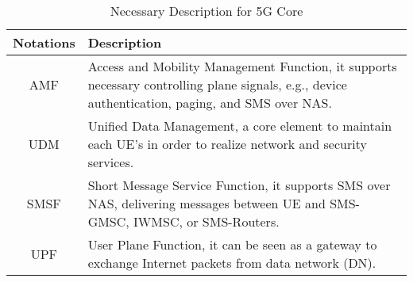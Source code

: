 \begin{table}[t]
	\caption{Necessary Description for 5G Core}\label{tab:5G}
	\centering
	\begin{tabular}{c|p{6cm}}
		\hline
		\textbf{Notations} & \textbf{Description} \\
		\hline
		AMF & Access and Mobility Management Function, it supports necessary controlling plane signals, e.g., device authentication, paging, and SMS over NAS.\\
		UDM & Unified Data Management, a core element to maintain each UE's in order to realize network and security services.\\
		SMSF & Short Message Service Function, it supports SMS over NAS, delivering messages between UE and SMS-GMSC, IWMSC, or SMS-Routers.\\
		UPF & User Plane Function, it can be seen as a gateway to exchange Internet packets from data network (DN).\\
	\end{tabular}
\end{table}



